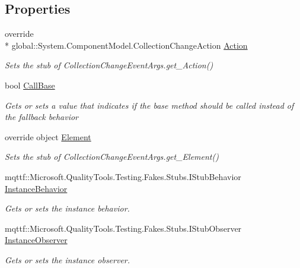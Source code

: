 \subsection*{Properties}
\begin{DoxyCompactItemize}
\item 
override \\*
global\-::\-System.\-Component\-Model.\-Collection\-Change\-Action \hyperlink{class_system_1_1_component_model_1_1_fakes_1_1_stub_collection_change_event_args_a24de97ffff8ab3f071af844251531c23}{Action}
\begin{DoxyCompactList}\small\item\em Sets the stub of Collection\-Change\-Event\-Args.\-get\-\_\-\-Action()\end{DoxyCompactList}\item 
bool \hyperlink{class_system_1_1_component_model_1_1_fakes_1_1_stub_collection_change_event_args_a7a5f96e01c663f9ef5e8da30a50cc3e0}{Call\-Base}
\begin{DoxyCompactList}\small\item\em Gets or sets a value that indicates if the base method should be called instead of the fallback behavior\end{DoxyCompactList}\item 
override object \hyperlink{class_system_1_1_component_model_1_1_fakes_1_1_stub_collection_change_event_args_a60ca00fc79124ea2510be7ab3d0dbf7a}{Element}
\begin{DoxyCompactList}\small\item\em Sets the stub of Collection\-Change\-Event\-Args.\-get\-\_\-\-Element()\end{DoxyCompactList}\item 
mqttf\-::\-Microsoft.\-Quality\-Tools.\-Testing.\-Fakes.\-Stubs.\-I\-Stub\-Behavior \hyperlink{class_system_1_1_component_model_1_1_fakes_1_1_stub_collection_change_event_args_ad077c6214d8f144cea7e3cfffd4c8074}{Instance\-Behavior}
\begin{DoxyCompactList}\small\item\em Gets or sets the instance behavior.\end{DoxyCompactList}\item 
mqttf\-::\-Microsoft.\-Quality\-Tools.\-Testing.\-Fakes.\-Stubs.\-I\-Stub\-Observer \hyperlink{class_system_1_1_component_model_1_1_fakes_1_1_stub_collection_change_event_args_a76afad577cbbdf311c5c60ebdc779a14}{Instance\-Observer}
\begin{DoxyCompactList}\small\item\em Gets or sets the instance observer.\end{DoxyCompactList}\end{DoxyCompactItemize}


